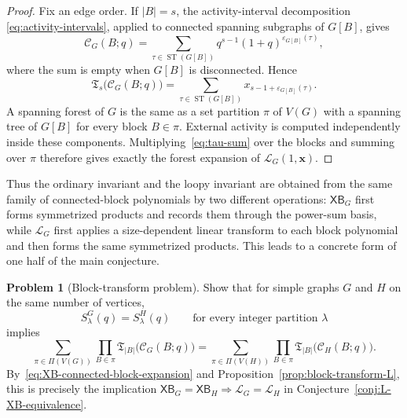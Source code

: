 \documentclass[11pt]{article}
\theoremstyle{plain}
\theoremstyle{definition}
\newtheorem{problem}[theorem]{Problem}
\renewcommand{\mathcal}{\mathscr}
\newcommand{\LL}{\mathcal{L}}    %
\newcommand{\cC}{\mathcal{C}}    %
\newcommand{\fT}{\mathfrak T}    %
\newcommand{\bx}{\mathbf{x}}
\newcommand{\XB}{\mathsf{XB}} %
\newcommand{\ST}{\operatorname{ST}} %
\newcommand{\eps}{\varepsilon}
\numberwithin{equation}{section}
\begin{document}
\begin{proof}
Fix an edge order.  If $|B|=s$, the activity-interval decomposition
\eqref{eq:activity-intervals}, applied to connected spanning subgraphs of $G[B]$, gives
\begin{equation}\label{eq:block-C-activity}
   \cC_G(B;q)
   =
   \sum_{\tau\in\ST(G[B])}
   q^{s-1}(1+q)^{\eps_{G[B]}(\tau)},
\end{equation}
where the sum is empty when $G[B]$ is disconnected.  Hence
  \begin{equation}\label{eq:tau-sum}   \fT_s\bigl(\cC_G(B;q)\bigr)
   =
   \sum_{\tau\in\ST(G[B])}
   x_{s-1+\eps_{G[B]}(\tau)}.
 \end{equation}
A spanning forest of $G$ is the same as a set partition $\pi$ of $V(G)$
 with a spanning tree of $G[B]$ for every block $B\in\pi$.  External
activity is computed independently inside these components.  Multiplying~\eqref{eq:tau-sum}
 over the blocks and summing over $\pi$ therefore gives exactly the forest expansion of $\LL_G(1,\bx)$.
\end{proof}

Thus the ordinary invariant and the loopy invariant are obtained from the
same family of connected-block polynomials by two different operations:
$\XB_G$ first forms symmetrized products and records them through the
power-sum basis, while $\LL_G$ first applies a size-dependent linear transform
to each block polynomial and then forms the same symmetrized products.  This
leads to a concrete form of one half of the main conjecture.

\begin{problem}[Block-transform problem]
\label{prob:block-transform}
Show that for simple graphs $G$ and $H$ on the same number of vertices,
\[
   S^G_\lambda(q)=S^H_\lambda(q) \qquad\text{for every integer partition }\lambda
\]
implies
\begin{equation}\label{eq:block-transform-problem}
  \sum_{\pi\in\Pi(V(G))} \prod_{B\in\pi}\fT_{|B|}
  \bigl(\cC_G(B;q)\bigr) = \sum_{\pi\in\Pi(V(H))}
   \prod_{B\in\pi}\fT_{|B|} \bigl(\cC_H(B;q)\bigr).
\end{equation}
By~\eqref{eq:XB-connected-block-expansion} and
Proposition~\ref{prop:block-transform-L}, this is precisely the implication
$\XB_G=\XB_H\Rightarrow\LL_G=\LL_H$ in Conjecture~\ref{conj:L-XB-equivalence}.
\end{problem}
\end{document}
